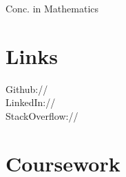 \documentclass[]{deedy-resume-openfont}
\begin{document}
\begin{minipage}[t]{0.33\textwidth}


  Conc. in Mathematics
  \sectionsep







\section{Links} 
Github:// \href{https://github.com/ericthewry}{} \\
LinkedIn://  \href{https://www.linkedin.com/in/eric-campbell-ba339490/}{} \\
StackOverflow:// \href{https://stackoverflow.com/users/8202530/ericthewry}{}
\sectionsep


\section{Coursework}


\end{minipage}
\end{document}
